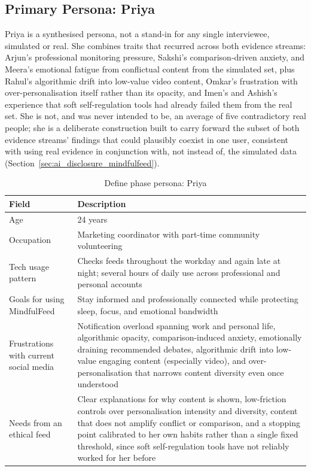 \documentclass[11pt]{article}
\begin{document}
\subsection{Primary Persona: Priya}
\label{sec:persona_priya}
Priya is a synthesised persona, not a stand-in for any single interviewee, simulated or real. She combines traits that recurred across both evidence streams: Arjun's professional monitoring pressure, Sakshi's comparison-driven anxiety, and Meera's emotional fatigue from conflictual content from the simulated set, plus Rahul's algorithmic drift into low-value video content, Omkar's frustration with over-personalisation itself rather than its opacity, and Imen's and Ashish's experience that soft self-regulation tools had already failed them from the real set. She is not, and was never intended to be, an average of five contradictory real people; she is a deliberate construction built to carry forward the subset of both evidence streams' findings that could plausibly coexist in one user, consistent with using real evidence in conjunction with, not instead of, the simulated data (Section~\ref{sec:ai_disclosure_mindfulfeed}).

\begin{table}[h]
\centering
\caption{Define phase persona: Priya}
\label{tab:persona_priya}
\small
\begin{tabular}{p{4cm}p{9.5cm}}
\hline
\textbf{Field} & \textbf{Description} \\
\hline
Age & 24 years \\
Occupation & Marketing coordinator with part-time community volunteering \\
Tech usage pattern & Checks feeds throughout the workday and again late at night; several hours of daily use across professional and personal accounts \\
Goals for using MindfulFeed & Stay informed and professionally connected while protecting sleep, focus, and emotional bandwidth \\
Frustrations with current social media & Notification overload spanning work and personal life, algorithmic opacity, comparison-induced anxiety, emotionally draining recommended debates, algorithmic drift into low-value engaging content (especially video), and over-personalisation that narrows content diversity even once understood \\
Needs from an ethical feed & Clear explanations for why content is shown, low-friction controls over personalisation intensity and diversity, content that does not amplify conflict or comparison, and a stopping point calibrated to her own habits rather than a single fixed threshold, since soft self-regulation tools have not reliably worked for her before \\
\hline
\end{tabular}
\end{table}
\end{document}
